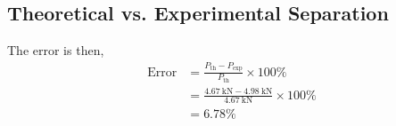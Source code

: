 \subsection{Theoretical vs. Experimental Separation}
The error is then,
\begin{align*}
    \text{Error} &= \frac{P_{\text{th}} - P_{\text{exp}}}{P_{\text{th}}} \times 100\% \\
    &= \frac{\qty{4.67}{\kilo\newton} - \qty{4.98}{\kilo\newton}}{\qty{4.67}{\kilo\newton}} \times 100\% \\
    &= \boxed{6.78\%}
\end{align*}